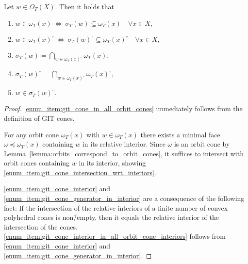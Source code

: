 \begin{lemma}
	\label{lemma:git_cones_alternative_descriptions}
	Let $w\in\Omega	_T(X)$. Then it holds that
	\begin{enumerate}[label={\upshape(\roman*)}]
		\item $w\in \omega_T(x) \ \Leftrightarrow\ \sigma_T(w) \subseteq \omega_T(x)\quad \forall x\in X,$
		\label{enum_item:git_cone_in_all_orbit_cones}
		\item $w\in \omega_T(x)^\circ \ \Leftrightarrow\ \sigma_T(w)^\circ \subseteq \omega_T(x)^\circ\quad \forall x\in X,$
		\label{enum_item:git_cone_interior_in_all_orbit_cone_interiors}
		\item $\sigma_T(w) = \bigcap\limits_{w\in \omega_T(x)^\circ} \omega_T(x),$
		\label{enum_item:git_cone_intersection_wrt_interiors}
		\item $\sigma_T(w)^\circ = \bigcap\limits_{w\in \omega_T(x)^\circ} \omega_T(x)^\circ,$
		\label{enum_item:git_cone_interior}
		\item $w\in\sigma_T(w)^\circ.$
		\label{enum_item:git_cone_generator_in_interior}
	\end{enumerate}
\end{lemma}
\begin{proof}
	\ref{enum_item:git_cone_in_all_orbit_cones} immediately follows from the definition of GIT cones.
	
	For any orbit cone $\omega_T(x)$ with $w\in\omega_T(x)$ there exists a minimal face $\omega\preceq \omega_T(x)$ containing $w$ in its relative interior. Since $\omega$ is an orbit cone by Lemma~\ref{lemma:orbits_correspond_to_orbit_cones}, it suffices to intersect with orbit cones containing $w$ in its interior, showing \ref{enum_item:git_cone_intersection_wrt_interiors}.
	
	\ref{enum_item:git_cone_interior} and \ref{enum_item:git_cone_generator_in_interior} are a consequence of the following fact: If the intersection of the relative interiors of a finite number of convex polyhedral cones is non\=/empty, then it equals the relative interior of the intersection of the cones. \ref{enum_item:git_cone_interior_in_all_orbit_cone_interiors} follows from \ref{enum_item:git_cone_interior} and \ref{enum_item:git_cone_generator_in_interior}.
\end{proof}

